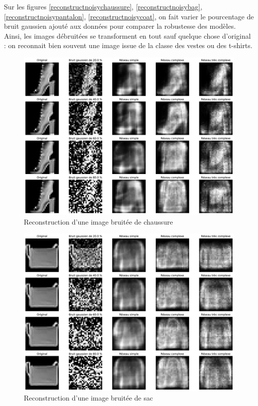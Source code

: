 \documentclass{article}
\begin{document}
Sur les figures \ref*{reconstructnoisychaussure}, \ref*{reconstructnoisybag}, \ref*{reconstructnoisypantalon}, \ref*{reconstructnoisycoat}, on fait varier le pourcentage de bruit gaussien ajouté aux données pour comparer la robustesse des modèles. Ainsi, les images débruitées se transforment en tout sauf quelque chose d'original : on reconnait bien souvent une image issue de la classe des vestes ou des t-shirts.

\begin{figure}[htbp]
    \centering
    \includegraphics*[width=\textwidth]{reconstruct_noisy_chaussure.pdf}
    \caption{Reconstruction d'une image bruitée de chaussure}
    \label{fig:reconstructnoisychaussure}
\end{figure}

\begin{figure}[htbp]
    \centering
    \includegraphics*[width=\textwidth]{reconstruct_noisy_sac.pdf}
    \caption{Reconstruction d'une image bruitée de sac}
    \label{fig:reconstructnoisybag}
\end{figure}
\end{document}
